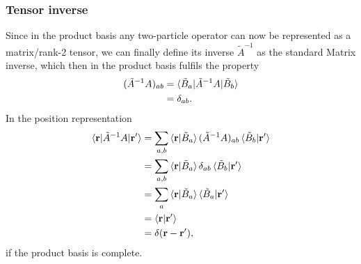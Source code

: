 \documentclass[12pt,a4paper]{scrartcl}
\numberwithin{equation}{section}
\renewcommand{\vec}{\mathbf}
\begin{document}
% 
% 

\subsubsection{Tensor inverse}

Since in the product basis any two-particle operator can now be
represented as a matrix/rank-2 tensor, we can finally define its inverse $\tilde{A}^{-1}$ as the standard Matrix inverse, which then in the product basis fulfils the property
\begin{align}
 (\tilde{A}^{-1}A)_{ab}
&= \braket{ \tilde{B}_a | \tilde{A}^{-1}A | \tilde{B}_b } \\
&= \delta_{ab}.
\end{align}
In the position representation
\begin{align}
\braket{\vec{r} | \tilde{A}^{-1}A | \vec{r}' }
 &= \sum_{a,b} \braket{\vec{r}|\tilde{B}_a} (\tilde{A}^{-1}A)_{ab}\braket{\tilde{B}_b|\vec{r}'} \\
%
&= \sum_{a,b} \braket{\vec{r}|\tilde{B}_a} \delta_{ab} \braket{\tilde{B}_b|\vec{r}'} \\
&= \sum_{a} \braket{\vec{r}|\tilde{B}_a} \braket{\tilde{B}_a|\vec{r}'} \\
&= \braket{\vec{r}|\vec{r}'} \\
&= \delta(\vec{r}-\vec{r}'),
\end{align}
if the product basis is complete.

\end{document}
